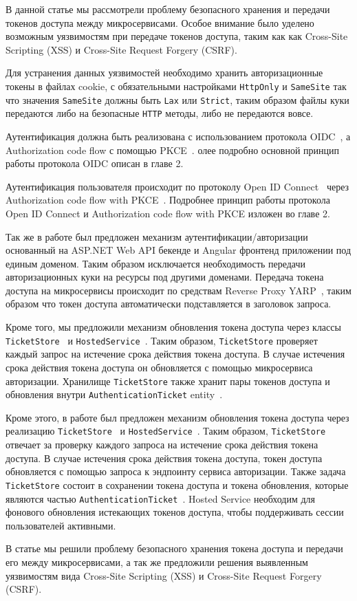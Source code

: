 В данной статье мы рассмотрели проблему безопасного хранения и передачи токенов доступа между микросервисами.
Особое внимание было уделено возможным уязвимостям при передаче токенов доступа, таким как как Cross-Site Scripting (XSS) и Cross-Site Request Forgery (CSRF).

Для устранения данных уязвимостей необходимо хранить авторизационные токены в файлах cookie, с обязательными
настройками \texttt{HttpOnly} и \texttt{SameSite} так что значения \texttt{SameSite} должны быть \texttt{Lax} или \texttt{Strict},
таким образом файлы куки передаются либо на безопасные \texttt{HTTP} методы, либо не передаются вовсе.

Аутентификация должна быть реализована с использованием протокола OIDC~\cite{siriwardenaOpenid2020, sakimuraOpenid2014}, а Authorization code flow с помощью PKCE~\cite{bradley2015rfc}.
олее подробно основной принцип работы протокола OIDC описан в главе 2.

Аутентификация пользователя происходит по протоколу Open ID Connect~\cite{siriwardenaOpenid2020, sakimuraOpenid2014} через Authorization code flow with PKCE~\cite{bradley2015rfc}.
Подробнее принцип работы протокола Open ID Connect и Authorization code flow with PKCE изложен во главе 2.

Так же в работе был предложен механизм аутентификации/авторизации основанный на ASP.NET Web API бекенде и Angular фронтенд приложении
под единым доменом.
Таким образом исключается необходимость передачи авторизационных куки на ресурсы под другими доменами.
Передача токена доступа на микросервисы происходит по средствам Reverse Proxy YARP~\cite{microsoftYarp2021}, таким образом что
токен доступа автоматически подставляется в заголовок запроса.

Кроме того, мы предложили механизм обновления токена доступа через классы \texttt{TicketStore}~\cite{microsoftIticketstore2023} и \texttt{HostedService}~\cite{microsoftHostedservice2023}.
Таким образом, \texttt{TicketStore} проверяет каждый запрос на истечение срока действия токена доступа.
В случае истечения срока действия токена доступа он обновляется с помощью микросервиса авторизации.
Хранилище \texttt{TicketStore} также хранит пары токенов доступа и обновления внутри
\texttt{AuthenticationTicket} entity~\cite{microsoftAuthenticationTicket2023}.

Кроме этого, в работе был предложен механизм обновления токена доступа через реализацию \texttt{TicketStore}~\cite{microsoftIticketstore2023} и \texttt{HostedService}~\cite{microsoftHostedservice2023}.
Таким образом, \texttt{TicketStore} отвечает за проверку каждого запроса на истечение срока действия токена доступа.
В случае истечения срока действия токена доступа, токен доступа обновляется с помощью запроса к эндпоинту сервиса авторизации.
Также задача \texttt{TicketStore} состоит в сохранении токена доступа и токена обновления, которые являются частью \texttt{AuthenticationTicket}~\cite{microsoftAuthenticationTicket2023}.
Hosted Service необходим для фонового обновления истекающих токенов доступа, чтобы поддерживать сессии пользователей активными.

В статье мы решили проблему безопасного хранения токена доступа и передачи его между микросервисами,
а так же предложили решения выявленным уязвимостям вида Cross-Site Scripting (XSS) и Cross-Site Request Forgery (CSRF).